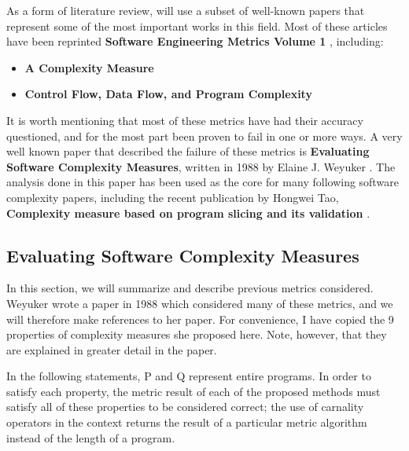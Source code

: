 \documentclass[]{article}
\begin{document}
As a form of literature review, will use a subset of well-known papers that represent some of the most important works in this field.
Most of these articles have been reprinted \textbf{Software Engineering Metrics Volume 1} \cite{sheppherd1993complexity}, including:
\begin{itemize}
	\item \textbf{A Complexity Measure} \cite{ref:a_complexity_measure}
	\item \textbf{Control Flow, Data Flow, and Program Complexity} \cite{ref:oviedo1993control}
\end{itemize}

It is worth mentioning that most of these metrics have had their accuracy questioned, and for the most part been proven to fail in one or more ways.
A very well known paper that described the failure of these metrics is \textbf{Evaluating Software Complexity Measures}, written in 1988 by Elaine J. Weyuker \cite{ref:evaluating_software_complexity_measures}.
The analysis done in this paper has been used as the core for many following software complexity papers, including the recent publication by Hongwei Tao, \textbf{Complexity measure based on program slicing and its validation} \cite{ref:tao2014complexity}.



\subsection{Evaluating Software Complexity Measures}


In this section, we will summarize and describe previous metrics considered.
Weyuker wrote a paper in 1988\cite{ref:evaluating_software_complexity_measures} which considered many of these metrics, and we will therefore make references to her paper.
For convenience, I have copied the 9 properties of complexity measures she proposed here. 
Note, however, that they are explained in greater detail in the paper.

In the following statements, P and Q represent entire programs.
In order to satisfy each property, the metric result of each of the proposed methods must satisfy all of these properties to be considered correct; the use of carnality operators in the context returns the result of a particular metric algorithm instead of the length of a program.
\end{document}
